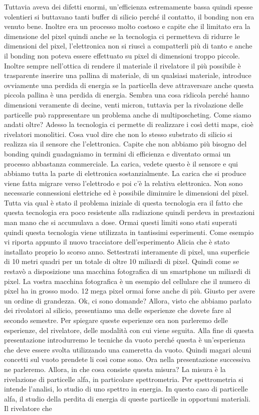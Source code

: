 {Tuttavia aveva dei difetti enormi, un'efficienza estremamente bassa quindi spesse volentieri si buttavano tanti buffer di silicio perché il contatto, il bonding non era venuto bene. Inoltre era un processo molto costoso e capite che il limitato era la dimensione del pixel quindi anche se la tecnologia ci permetteva di ridurre le dimensioni del pixel, l'elettronica non si riuscì a compatterli più di tanto e anche il bonding non poteva essere effettuato su pixel di dimensioni troppo piccole. Inoltre sempre nell'ottica di rendere il materiale il rivelatore il più possibile è trasparente inserire una pallina di materiale, di un qualsiasi materiale, introduce ovviamente una perdida di energia se la particella deve attraversare anche questa piccola pallina è una perdida di energia. Sembra una cosa ridicola perché hanno dimensioni veramente di decine, venti micron, tuttavia per la rivolazione delle particelle può rappresentare un problema anche di multiposcheting. Come siamo andati oltre? Adesso la tecnologia ci permette di realizzare i così detti maps, cioè rivelatori monolitici. Cosa vuol dire che non lo stesso substrato di silicio si realizza sia il sensore che l'elettronica. Capite che non abbiamo più bisogno del bonding quindi guadagniamo in termini di efficienza e diventato ormai un processo abbastanza commerciale. La carica, vedete questo è il sensore e qui abbiamo tutta la parte di elettronica sostanzialmente. La carica che si produce viene fatta migrare verso l'elettrodo e poi c'è la relativa elettronica. Non sono necessarie connessioni elettriche ed è possibile diminuire le dimensioni del pixel. Tutta via qual è stato il problema iniziale di questa tecnologia era il fatto che questa tecnologia era poco resistente alla radiazione quindi perdeva in prestazioni man mano che si accumulava a dose. Ormai questi limiti sono stati superati quindi questa tecnologia viene utilizzata in tantissimi esperimenti. Come esempio vi riporta appunto il nuovo tracciatore dell'esperimento Alicia che è stato installato proprio lo scorso anno. Settestrati interamente di pixel, una superficie di 10 metri quadri per un totale di oltre 10 miliardi di pixel. Quindi come se restavò a disposizione una macchina fotografica di un smartphone un miliardi di pixel. La vostra macchina fotografica è un esempio del cellulare che il numero di pixel ha in grosso modo. 12 mega pixel ormai forse anche di più. Giusto per avere un ordine di grandezza. Ok, ci sono domande? Allora, visto che abbiamo parlato dei rivolatori al silicio, presentiamo una delle esperienze che dovete fare al secondo semestre. Per spiegare queste esperienze ora non parleremo delle esperienze, del rivelatore, delle modalità con cui viene seguita. Alla fine di questa presentazione introdurremo le tecniche da vuoto perché questa è un'esperienza che deve essere svolta utilizzando una cameretta da vuoto. Quindi magari alcuni concetti sul vuoto prendete li così come sono. Ora nella presentazione successiva ne parleremo. Allora, in che cosa consiste questa misura? La misura è la rivelazione di particelle alfa, in particolare spettrometria. Per spettrometria si intende l'analisi, lo studio di uno spettro in energia. In questo caso di particelle alfa, il studio della perdita di energia di queste particelle in opportuni materiali. Il rivelatore che }
